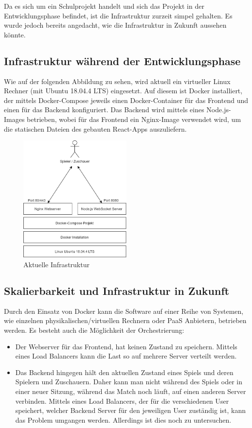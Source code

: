 \documentclass[11pt,a4paper,german]{scrartcl}
\begin{document}
Da es sich um ein Schulprojekt handelt und sich das Projekt in der Entwicklungsphase befindet, ist die Infrastruktur zurzeit simpel gehalten. Es wurde jedoch bereits angedacht, wie die Infrastruktur in Zukunft aussehen könnte.

\subsection{Infrastruktur während der Entwicklungsphase}
Wie auf der folgenden Abbildung zu sehen, wird aktuell ein virtueller Linux Rechner (mit Ubuntu 18.04.4 LTS) eingesetzt. Auf diesem ist Docker installiert, der mittels Docker-Compose jeweils einen Docker-Container für das Frontend und einen für das Backend konfiguriert. Das Backend wird mittels eines Node.js-Images betrieben, wobei für das Frontend ein Nginx-Image verwendet wird, um die statischen Dateien des gebauten React-Apps auszuliefern.

\begin{figure}[h]
  \centering
  \includegraphics[width=0.5\textwidth]{infrastructure_current.png}
  \caption{Aktuelle Infrastruktur}
\end{figure}

\subsection{Skalierbarkeit und Infrastruktur in Zukunft}
Durch den Einsatz von Docker kann die Software auf einer Reihe von Systemen, wie einzelnen physikalischen/virtuellen Rechnern oder PaaS Anbietern, betrieben werden. Es besteht auch die Möglichkeit der Orchestrierung: 
\begin{itemize}
  \item Der Webserver für das Frontend, hat keinen Zustand zu speichern. Mittels eines Load Balancers kann die Last so auf mehrere Server verteilt werden.
  \item Das Backend hingegen hält den aktuellen Zustand eines Spiels und deren Spielern und Zuschauern. Daher kann man nicht während des Spiels oder in einer neuer Sitzung, während das Match noch läuft, auf einen anderen Server verbinden. Mittels eines Load Balancers, der für die verschiedenen User speichert, welcher Backend Server für den jeweiligen User zuständig ist, kann das Problem umgangen werden. Allerdings ist dies noch zu untersuchen.
\end{itemize}
\end{document}
